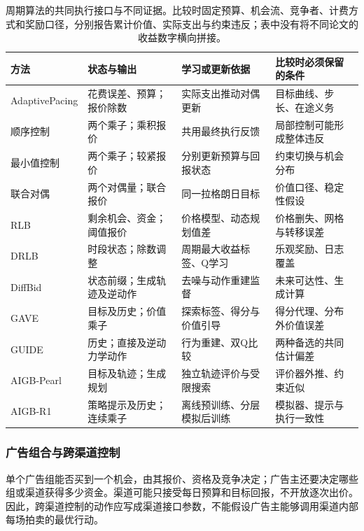 \begin{table}[htbp]
  \centering
  \small
  \begin{tabularx}{\linewidth}{@{}lXXX@{}}
    \toprule
    方法 & 状态与输出 & 学习或更新依据 & 比较时必须保留的条件\\
    \midrule
    AdaptivePacing & 花费误差、预算；报价除数 & 实际支出推动对偶更新 & 目标曲线、步长、在途义务\\
    顺序控制 & 两个乘子；乘积报价 & 共用最终执行反馈 & 局部控制可能形成整体违反\\
    最小值控制 & 两个乘子；较紧报价 & 分别更新预算与回报状态 & 约束切换与机会分布\\
    联合对偶 & 两个对偶量；联合报价 & 同一拉格朗日目标 & 价值口径、稳定性假设\\
    RLB & 剩余机会、资金；阈值报价 & 价格模型、动态规划值差 & 价格删失、网格与转移误差\\
    DRLB & 时段状态；除数调整 & 周期最大收益标签、Q学习 & 乐观奖励、日志覆盖\\
    DiffBid & 状态前缀；生成轨迹及逆动作 & 去噪与动作重建监督 & 未来可达性、生成计算\\
    GAVE & 目标及历史；价值乘子 & 探索标签、得分与价值引导 & 得分代理、分布外价值误差\\
    GUIDE & 历史；直接及逆动力学动作 & 行为重建、双Q比较 & 两种备选的共同估计偏差\\
    AIGB-Pearl & 目标及轨迹；生成规划 & 独立轨迹评价与受限搜索 & 评价器外推、约束近似\\
    AIGB-R1 & 策略提示及历史；连续乘子 & 离线预训练、分层模拟后训练 & 模拟器、提示与执行一致性\\
    \bottomrule
  \end{tabularx}
  \caption{周期算法的共同执行接口与不同证据。比较时固定预算、机会流、竞争者、计费方式和奖励口径，分别报告累计价值、实际支出与约束违反；表中没有将不同论文的收益数字横向拼接。}
  \label{tab:rs-advertising-cycle-methods}
\end{table}

\subsubsection{广告组合与跨渠道控制}
\label{sec:rs-advertising-channels}

单个广告组能否买到一个机会，由其报价、资格及竞争决定；广告主还要决定哪些组或渠道获得多少资金。渠道可能只接受每日预算和目标回报，不开放逐次出价。因此，跨渠道控制的动作应写成渠道接口参数，不能假设广告主能够调用渠道内部每场拍卖的最优行动。


